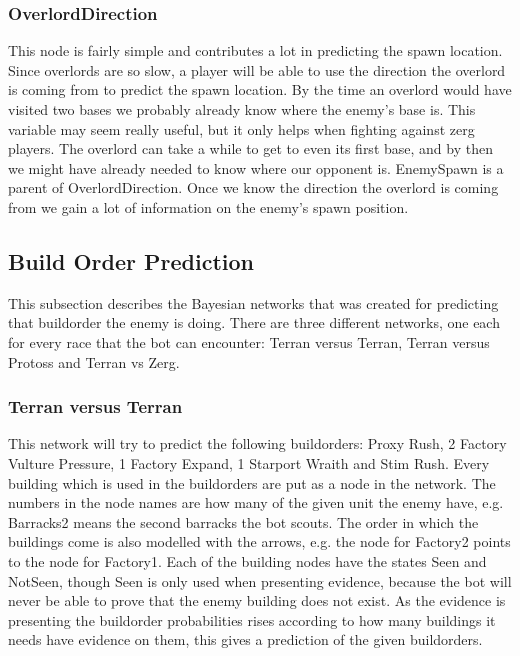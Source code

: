 \subsubsection*{OverlordDirection} This node is fairly simple and contributes a lot in predicting the spawn location. Since overlords are so slow, a player will be able to use the direction the overlord is coming from to predict the spawn location. By the time an overlord would have visited two bases we probably already know where the enemy's base is. This variable may seem really useful, but it only helps when fighting against zerg players. The overlord can take a while to get to even its first base, and by then we might have already needed to know where our opponent is. EnemySpawn is a parent of OverlordDirection. Once we know the direction the overlord is coming from we gain a lot of information on the enemy's spawn position.

\subsection{Build Order Prediction}
This subsection describes the Bayesian networks that was created for predicting that buildorder the enemy is doing. There are three different networks, one each for every race that the bot can encounter: Terran versus Terran, Terran versus Protoss and Terran vs Zerg.

\subsubsection{Terran versus Terran}
	This network will try to predict the following buildorders: Proxy Rush, 2 Factory Vulture Pressure, 1 Factory Expand, 1 Starport Wraith and Stim Rush. 
	Every building which is used in the buildorders are put as a node in the network. The numbers in the node names are how many of the given unit the 
	enemy have, e.g. Barracks2 means the second barracks the bot scouts. The order in which the buildings come is also modelled with the arrows, 
	e.g. the node for Factory2 points to the node for Factory1. Each of the building nodes have the states Seen and NotSeen, though Seen is only used when 
	presenting evidence, because the bot will never be able to prove that the enemy building does not exist. As the evidence is presenting the buildorder 
	probabilities rises according to how many buildings it needs have evidence on them, this gives a prediction of the given buildorders.
	

